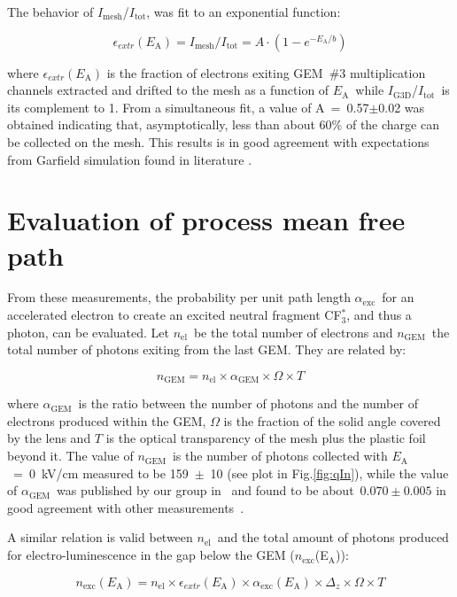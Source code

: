 \documentclass[a4paper,11pt]{article}
\newcommand{\Itot}{$I_{\mathrm{tot}}$}
\newcommand{\Ig}  {$I_{\mathrm{G3D}}$}
\newcommand{\Ime}  {$I_{\mathrm{mesh}}$}
\newcommand{\Ea}  {$E_{\mathrm{A}}$}
\newcommand{\nel}  {$n_{\mathrm{el}}$}
\newcommand{\ngem}  {$n_{\mathrm{GEM}}$}
\newcommand{\agem}  {$\alpha_{\mathrm{GEM}}$}
\newcommand{\nm}  {$n_{\mathrm{exc}}$}
\newcommand{\aex}  {$\alpha_{\mathrm{exc}}$}
\begin{document}
The behavior of \Ime /\Itot, was fit to an exponential function:

\begin{equation}
\epsilon_{extr}(E_{\mathrm{A}}) = I_{\mathrm{mesh}}/I_{\mathrm{tot}} = A\cdot(1-e^{-E_{\mathrm{A}}/b})
\end{equation}

where $\epsilon_{extr}(E_{\mathrm{A}})$ is the fraction
of electrons exiting GEM~\#3 multiplication channels extracted and drifted to
the mesh as a function of \Ea\ while \Ig/\Itot\ is its complement to 1.
From a simultaneous fit, a value of A~=~0.57$\pm$0.02 was obtained indicating that, asymptotically, less than about 60\% of the charge can be collected on the mesh. This results is in good agreement with expectations from Garfield simulation found in literature \cite{bib:thesis, bib:Bonivento, bib:ieee_benci}.


\section{Evaluation of process mean free path}

From these measurements, the probability per unit path length \aex\ for an accelerated electron to create an excited neutral fragment CF$^*_3$, and thus a photon, can be evaluated. Let \nel\ be the total number of electrons and \ngem\ the total number of photons exiting from the last GEM. They are related by:

\begin{equation}
n_{\mathrm{GEM}} = n_{\mathrm{el}} \times \alpha_{\mathrm{GEM}} \times \Omega \times T
\label{eq:1}
\end{equation}

where \agem\ is the ratio between the number of photons and the number of electrons produced within the GEM, $\Omega$ is the fraction of the solid angle covered by the lens and $T$ is the optical transparency of the mesh plus the plastic foil beyond it.
The value of \ngem\ is the number of photons collected with \Ea~=~0~kV/cm measured to be 159~$\pm$~10 (see plot in Fig.\ref{fig:qIn}), while the value of \agem\ was published by our group in~\cite{bib:ieee_orange} and found to be about~$0.070\pm0.005$ in good agreement with other measurements~\cite{bib:Margato1}.

A similar relation is valid between \nel\ and the total amount of photons produced for electro-luminescence in the gap below the GEM (\nm(E$_{\mathrm{A}}$)):

\begin{equation}
n_{\mathrm{exc}}(E_{\mathrm{A}}) =  n_{\mathrm{el}} \times \epsilon_{extr}(E_{\mathrm{A}}) \times \alpha_{\mathrm{exc}}(E_{\mathrm{A}}) \times \Delta_z \times \Omega \times T 
\label{eq:2}
\end{equation}
\end{document}
